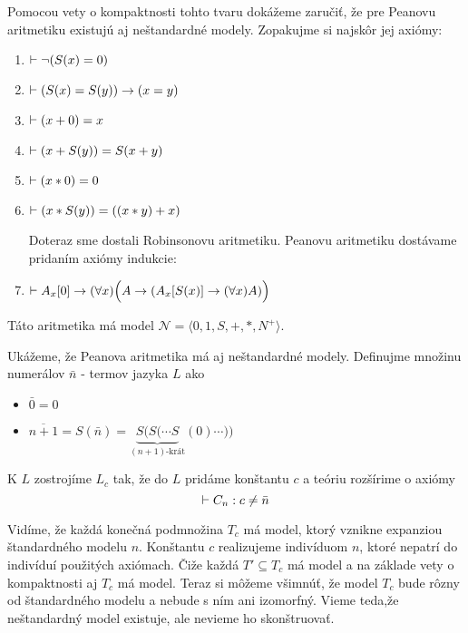 \begin{priklad}
    Pomocou vety o kompaktnosti tohto tvaru dokážeme zaručiť,
    že pre Peanovu aritmetiku existujú aj neštandardné modely.
    Zopakujme si najskôr jej axiómy:

    \begin{enumerate}
    \item $\vdash \neg (S(x) = 0)$
    \item $\vdash (S(x) = S(y)) \rightarrow (x=y)$
    \item $\vdash (x+0) = x$
    \item $\vdash (x+S(y)) = S(x+y)$
    \item $\vdash (x * 0) = 0$
    \item $\vdash (x * S(y)) = ((x*y)+x)$
    \par \noindent Doteraz sme dostali Robinsonovu aritmetiku. Peanovu
    aritmetiku dostávame pridaním axiómy indukcie:
    \item $\vdash A_x[0] \rightarrow (\forall x)\Big(A \rightarrow (
            A_x[S(x)] \rightarrow (\forall x)A)\Big)$
    \end{enumerate}
    Táto aritmetika má model 
    $\mathcal{N} = \langle 0,1,S,+,*,N^+ \rangle$.

    Ukážeme, že Peanova aritmetika má aj neštandardné modely.
    Definujme množinu numerálov $\bar{n}$ - termov jazyka $L$ ako
    \begin{itemize}
    \item $\bar{0} = 0$
    \item $\overline{n+1} = S(\bar{n}) = 
        \underbrace{S(S( \cdots S}_{(n+1)\mbox{-krát}}(0) \cdots ))$
    \end{itemize}

    K $L$ zostrojíme $L_c$ tak, že do $L$ pridáme konštantu $c$ a
    teóriu rozšírime o axiómy
    \begin{equation*}
        \vdash C_n: c \not= \bar{n}
    \end{equation*}

    Vidíme, že každá konečná podmnožina $T_c$ má model,
    ktorý vznikne expanziou štandardného modelu $n$.
    Konštantu $c$ realizujeme indivíduom $n$, ktoré nepatrí do
    indivíduí použitých axiómach.
    Čiže každá $T' \subseteq T_c$ má model a na základe vety o kompaktnosti 
    aj $T_c$ má model. Teraz si môžeme všimnúť, že model $T_c$ bude rôzny
    od štandardného modelu a nebude s ním ani izomorfný.
    Vieme teda,že neštandardný model existuje, ale nevieme ho skonštruovať.
\end{priklad}
